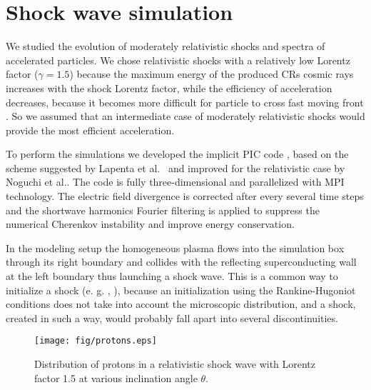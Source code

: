 \documentclass[a4paper]{jpconf}
\begin{document}
\section{Shock wave simulation}
We studied the evolution of moderately relativistic shocks and spectra of accelerated particles. We chose relativistic shocks with a relatively low Lorentz factor ($\gamma=1.5$) because the maximum energy of the produced CRs cosmic rays increases with the shock Lorentz factor, while the efficiency of acceleration decreases, 
because it becomes more difficult for particle to cross fast moving front
%
\cite{Ellison2013}. So we assumed that an intermediate case of moderately relativistic shocks would provide the most efficient acceleration.

To perform the simulations we developed the implicit PIC code \cite{Romansky2016}, based on the scheme suggested by Lapenta et al.~\cite{Lapenta2006} and improved for the relativistic case by Noguchi et al.\cite{Noguchi2007}.
The code is fully three-dimensional and parallelized with MPI technology. The electric field divergence is corrected
after every several time steps and 
the shortwave harmonics Fourier filtering is applied
to suppress the numerical Cherenkov instability and improve energy conservation.

In the modeling setup the homogeneous plasma flows into the simulation box through its right boundary
and collides with the reflecting superconducting wall at the left boundary thus launching a shock wave. This  is a common way to initialize a shock (e. g. \cite{Sironi2011}, \cite{Iwamoto2017}), because an initialization using the Rankine-Hugoniot conditions does not take into account the microscopic distribution, and a shock, created in such a way, would probably fall apart into several discontinuities.

\begin{figure}[h!]
	\centering
	\texttt{[image: fig/protons.eps]} 
	\caption{Distribution of protons in a relativistic shock wave with Lorentz factor 1.5 at various inclination angle $\theta$.}
	\label{protons}
\end{figure} 
\end{document}
